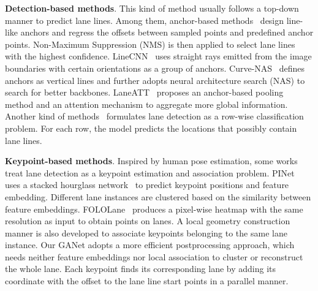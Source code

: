 \documentclass[10pt,twocolumn,letterpaper]{article}
\begin{document}
\textbf{Detection-based methods}. This kind of method usually follows a top-down manner to predict lane lines. 
Among them, anchor-based methods~\cite{linecnn,Tabelini_2021_CVPR,Xu2020} design line-like anchors and regress the offsets between sampled points and predefined anchor points. Non-Maximum Suppression (NMS) is then applied to select lane lines with the highest confidence.
LineCNN~\cite{linecnn} uses straight rays emitted from the image boundaries with certain orientations as a group of anchors. 
Curve-NAS~\cite{Xu2020} defines anchors as vertical lines and further adopts neural architecture search (NAS) to search for better backbones.
LaneATT~\cite{Tabelini_2021_CVPR} proposes an anchor-based pooling method and an attention mechanism to aggregate more global information. 
Another kind of methods~\cite{qin2020ultra, Liu_2021_ICCV} formulates lane detection as a row-wise classification problem. For each row, the model predicts the locations that possibly contain lane lines.

\textbf{Keypoint-based methods}.
Inspired by human pose estimation, some works treat lane detection as a keypoint estimation and association problem.
PINet~\cite{Ko2021} uses a stacked hourglass network~\cite{Newell2016} to predict keypoint positions and feature embedding. Different lane instances are clustered based on the similarity between feature embeddings.
FOLOLane~\cite{Qu_2021_CVPR} produces a pixel-wise heatmap with the same resolution as input to obtain points on lanes. A local geometry construction manner is also developed to associate keypoints belonging to the same lane instance.
Our GANet adopts a more efficient postprocessing approach, which needs neither feature embeddings nor local association to cluster or reconstruct the whole lane. Each keypoint finds its corresponding lane by adding its coordinate with the offset to the lane line start points in a parallel manner.
\end{document}
